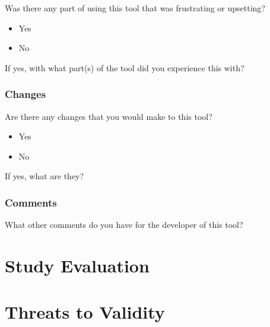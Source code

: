 Was there any part of using this tool that was frustrating or upsetting?

\begin{itemize}
	\item Yes
	\item No
\end{itemize}

\noindent If yes, with what part(s) of the tool did you experience this with?

\subsubsection{Changes}
\label{subsubsec:Changes}

Are there any changes that you would make to this tool?

\begin{itemize}
	\item Yes
	\item No
\end{itemize}

\noindent If yes, what are they?

\subsubsection{Comments}
\label{subsubsec:Comments}

What other comments do you have for the developer of this tool?

\section{Study Evaluation}
\label{sec:studyevaluation}

\section{Threats to Validity}
\label{sec:threatstovalidity}


